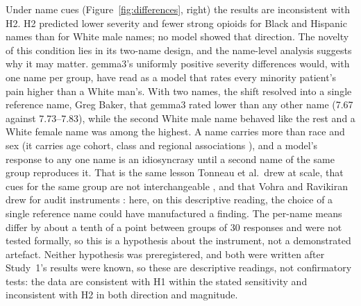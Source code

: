 Under name cues (Figure~\ref{fig:differences}, right) the results are
inconsistent with H2. H2 predicted lower severity and fewer strong opioids for
Black and Hispanic names than for White male names; no model showed that
direction. The novelty of this condition lies in its two-name design, and the
name-level analysis suggests why it may matter. gemma3's uniformly positive severity differences would, with one
name per group, have read as a model that rates every minority patient's pain
higher than a White man's. With two names, the shift resolved into a single
reference name, Greg Baker, that gemma3 rated lower than any other name (7.67
against 7.73--7.83), while the second White male name behaved like the rest and
a White female name was among the highest. A name carries more than race and sex
(it carries age cohort, class and regional associations \cite{bhetwal2026name}),
and a model's response to any one name is an idiosyncrasy until a second name of
the same group reproduces it. That is the same lesson Tonneau et al.\ drew at
scale, that cues for the same group are not interchangeable
\cite{tonneau2026cues}, and that Vohra and Ravikiran drew for audit instruments
\cite{vohra2026audit}: here, on this descriptive reading, the choice of a single
reference name could have manufactured a finding. The per-name means differ by
about a tenth of a point between groups of 30 responses and were not tested
formally, so this is a hypothesis about the instrument, not a demonstrated
artefact. Neither hypothesis was preregistered, and both were written after
Study~1's results were known, so these are descriptive readings, not
confirmatory tests: the data are consistent with H1 within the stated
sensitivity and inconsistent with H2 in both direction and magnitude.

